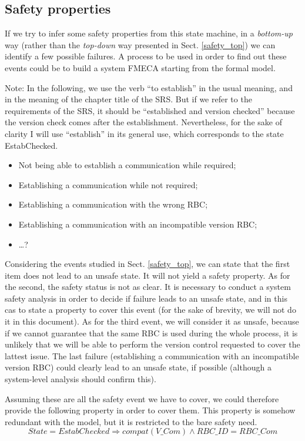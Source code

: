 \documentclass{template/openetcs_article}
\begin{document}
\subsection{Safety properties}
If we try to infer some safety properties from this state machine, in a \emph{bottom-up} way 
(rather than the \emph{top-down} way presented in Sect. \ref{safety_top}) we can identify 
a few possible failures. A process to be used in order to find out these events could be
to build a system FMECA starting from the formal model.

Note: In the following, we use the verb ``to establish'' in the usual meaning, and in the meaning of the chapter title of the SRS. But if we refer to the requirements of the SRS, it should be ``established and version checked'' because the version check comes after the establishment. Nevertheless, for the sake of clarity I will use ``establish'' in its general use, which corresponds to the state EstabChecked.

\begin{itemize}
\item Not being able to establish a communication while required;
\item Establishing a communication while not required;
\item Establishing a communication with the wrong RBC;
\item Establishing a communication with an incompatible version RBC;
\item \dots ?
\end{itemize}

Considering the events studied in Sect. \ref{safety_top}, we can state that the first item does 
not lead to an unsafe state. It will not yield a safety property. As for the second, the safety status 
is not as clear. It is necessary to conduct a system safety analysis in order to decide if failure 
leads to an unsafe state, and in this cas to state a property to cover this event
(for the sake of brevity, we will not do it in this document). As for the third event, we will consider
it as unsafe, because if we cannot guarantee that the same RBC is used during the whole process, it is 
unlikely that we will be able to perform the version control requested to cover the lattest issue.
The last failure (establishing a communication with an incompatible version
RBC) could clearly lead to an unsafe state, if possible (although a system-level analysis should 
confirm this).

Assuming these are all the safety event we have to cover, we could therefore provide the following 
property in order to cover them. This property is somehow redundant with the model, but it is restricted
to the bare safety need.
$$State = EstabChecked \Rightarrow compat(V\_Com)\wedge RBC\_ID = RBC\_Com$$
\end{document}
